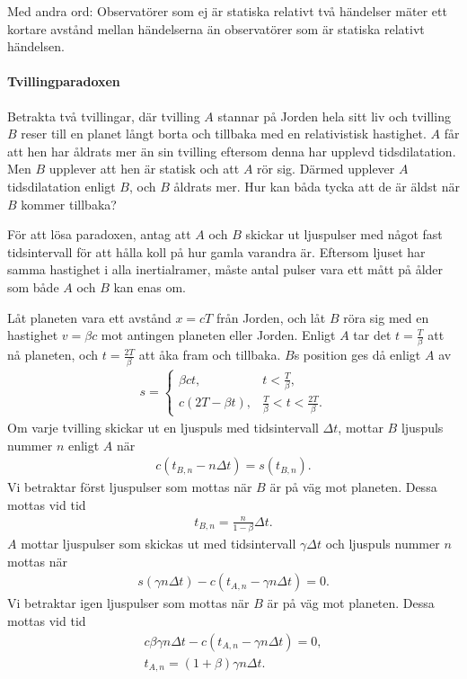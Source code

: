 Med andra ord: Observatörer som ej är statiska relativt två händelser mäter ett kortare avstånd mellan händelserna än observatörer som är statiska relativt händelsen.

\paragraph{Tvillingparadoxen}
Betrakta två tvillingar, där tvilling $A$ stannar på Jorden hela sitt liv och tvilling $B$ reser till en planet långt borta och tillbaka med en relativistisk hastighet. $A$ får att hen har åldrats mer än sin tvilling eftersom denna har upplevd tidsdilatation. Men $B$ upplever att hen är statisk och att $A$ rör sig. Därmed upplever $A$ tidsdilatation enligt $B$, och $B$ åldrats mer. Hur kan båda tycka att de är äldst när $B$ kommer tillbaka?

För att lösa paradoxen, antag att $A$ och $B$ skickar ut ljuspulser med något fast tidsintervall för att hålla koll på hur gamla varandra är. Eftersom ljuset har samma hastighet i alla inertialramer, måste antal pulser vara ett mått på ålder som både $A$ och $B$ kan enas om.

Låt planeten vara ett avstånd $x = cT$ från Jorden, och låt $B$ röra sig med en hastighet $v = \beta c$ mot antingen planeten eller Jorden. Enligt $A$ tar det $t = \frac{T}{\beta}$ att nå planeten, och $t = \frac{2T}{\beta}$ att åka fram och tillbaka. $B$s position ges då enligt $A$ av
\begin{align*}
	s =
	\begin{cases}
		\beta ct,       &t < \frac{T}{\beta}, \\
		c(2T - \beta t), &\frac{T}{\beta} < t < \frac{2T}{\beta}.
	\end{cases}
\end{align*}
Om varje tvilling skickar ut en ljuspuls med tidsintervall $\Delta t$, mottar $B$ ljuspuls nummer $n$ enligt $A$ när
\begin{align*}
	c(t_{B, n} - n\Delta t) = s(t_{B, n}).
\end{align*}
Vi betraktar först ljuspulser som mottas när $B$ är på väg mot planeten. Dessa mottas vid tid
\begin{align*}
	t_{B, n} = \frac{n}{1 - \beta}\Delta t. 
\end{align*}
$A$ mottar ljuspulser som skickas ut med tidsintervall $\gamma\Delta t$ och ljuspuls nummer $n$ mottas när
\begin{align*}
	s(\gamma n\Delta t) - c(t_{A, n} - \gamma n\Delta t) = 0.
\end{align*}
Vi betraktar igen ljuspulser som mottas när $B$ är på väg mot planeten. Dessa mottas vid tid
\begin{align*}
	c\beta\gamma n\Delta t - c(t_{A, n} - \gamma n\Delta t) = 0, \\
	t_{A, n} = (1 + \beta)\gamma n\Delta t.
\end{align*}


